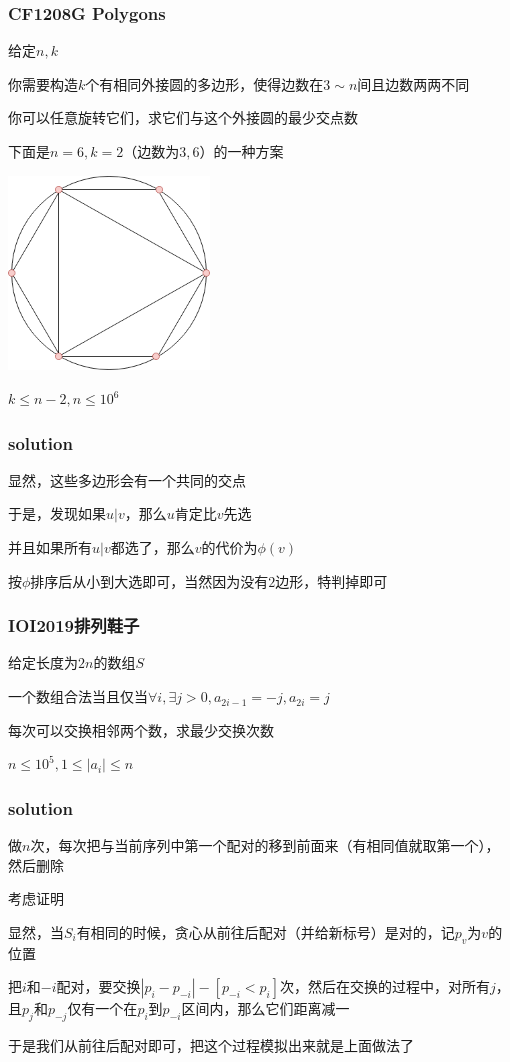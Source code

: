 \documentclass[10pt]{beamer}
\begin{document}
	\begin{frame}
		\frametitle{CF1208G Polygons}
		\par 给定$n,k$
		\par 你需要构造$k$个有相同外接圆的多边形，使得边数在$3\sim n$间且边数两两不同
		\par 你可以任意旋转它们，求它们与这个外接圆的最少交点数
		\par 下面是$n=6,k=2$（边数为$3,6$）的一种方案
		\par \includegraphics[width = 0.4\textwidth]{1.png}
		\par $k\le n-2,n\le 10^6$
	\end{frame}
	\clearpage
	\begin{frame}
		\frametitle{solution}
		 显然，这些多边形会有一个共同的交点

		 于是，发现如果$u|v$，那么$u$肯定比$v$先选

		 并且如果所有$u|v$都选了，那么$v$的代价为$\phi(v)$

		 按$\phi$排序后从小到大选即可，当然因为没有$2$边形，特判掉即可
	\end{frame}
	\clearpage
	\begin{frame}
		\frametitle{IOI2019排列鞋子}
		\par 给定长度为$2n$的数组$S$
		\par 一个数组合法当且仅当$\forall i,\exists j>0,a_{2i-1}=-j,a_{2i}=j$
		\par 每次可以交换相邻两个数，求最少交换次数
		\par $n\le 10^5,1\le |a_i|\le n$
	\end{frame}
	\clearpage
	\begin{frame}
		\frametitle{solution}
		 做$n$次，每次把与当前序列中第一个配对的移到前面来（有相同值就取第一个），然后删除

		 考虑证明

		 显然，当$S_i$有相同的时候，贪心从前往后配对（并给新标号）是对的，记$p_v$为$v$的位置

		 把$i$和$−i$配对，要交换$|p_i−p_{−i}|−[p_{−i}<p_i]$次，然后在交换的过程中，对所有$j$，且$p_j$和$p_{−j}$仅有一个在$p_i$到$p_{−i}$区间内，那么它们距离减一

		 于是我们从前往后配对即可，把这个过程模拟出来就是上面做法了 
	\end{frame}
\end{document}
